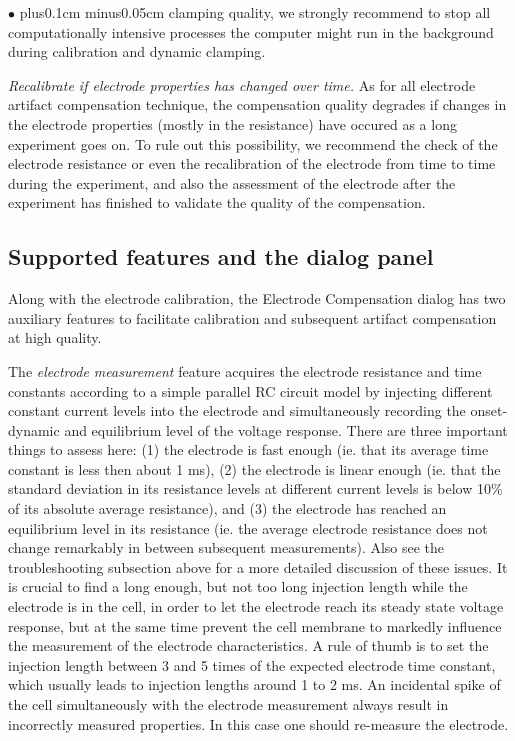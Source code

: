 \documentclass{article}
\newenvironment{myitem}{\begin{list}{$\bullet$}{\setlength{\leftmargin}{1.1em}
\itemsep0.1cm plus0.1cm minus0.05cm
\listparindent0cm
\addtolength{\labelsep}{0.5\labelsep}
\setlength{\labelwidth}{0.8em}
\setlength{\leftmargin}{\labelwidth}
\addtolength{\leftmargin}{\labelsep}
}}{\end{list}}
\begin{document}
\begin{myitem}
  clamping quality, we strongly recommend to stop
  all computationally intensive processes the computer might run in the
  background during calibration and dynamic clamping.
\item \emph{Recalibrate if electrode properties has changed over time.} As
  for all electrode artifact compensation technique, the compensation quality
  degrades if changes in the electrode properties (mostly in the
  resistance) have occured as a long experiment goes on. To rule out this
  possibility, we recommend the check of the electrode resistance or even
  the recalibration of the electrode from time to time during the
  experiment, and also the assessment of the electrode after the
  experiment has finished to validate the quality of the compensation. 
\end{myitem}

\subsection{Supported features and the dialog panel}

Along with the electrode calibration, the Electrode Compensation dialog has
two auxiliary features to facilitate calibration and subsequent
artifact compensation at high quality. 

The \emph{electrode measurement} feature acquires the electrode resistance
and time constants according to a simple parallel RC circuit model by
injecting different constant current levels into the electrode and
simultaneously recording the onset-dynamic and equilibrium level of the
voltage response. There are three important things to assess here: (1) the
electrode is fast enough (ie. that its average time constant is less then
about 1 ms), (2) the electrode is linear enough (ie. that the standard
deviation in its resistance levels at different current levels is below
10\% of its absolute average resistance), and (3) the electrode has reached
an equilibrium level in its resistance (ie. the average electrode
resistance does not change remarkably in between subsequent
measurements). Also see the troubleshooting subsection above for a more
detailed discussion of these issues. It is crucial to find a long enough,
but not too long injection length while the electrode is in the cell, in
order to let the electrode reach its steady state voltage response, but at
the same time prevent the cell membrane to markedly influence the
measurement of the electrode characteristics. A rule of thumb is to set the
injection length between 3 and 5 times of the expected electrode time
constant, which usually leads to injection lengths around 1 to 2 ms. An
incidental spike of the cell simultaneously with the electrode measurement
always result in incorrectly measured properties. In this case one should
re-measure the electrode. 
\end{document}

